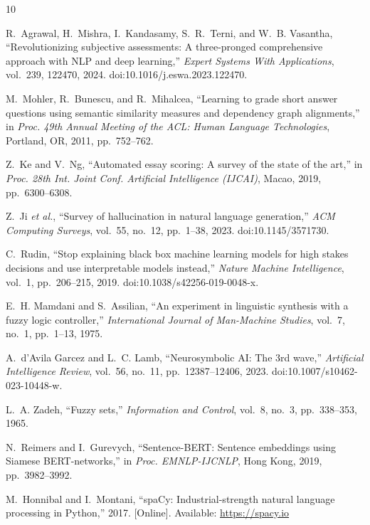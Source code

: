 \documentclass[11pt,a4paper]{article}
\begin{document}
\begin{thebibliography}{10}
\setlength{\itemsep}{0.45em}

R.~Agrawal, H.~Mishra, I.~Kandasamy, S.~R.~Terni, and W.~B. Vasantha,
``Revolutionizing subjective assessments: A three-pronged comprehensive approach
with NLP and deep learning,'' \emph{Expert Systems With Applications}, vol.~239,
122470, 2024. doi:10.1016/j.eswa.2023.122470.

M.~Mohler, R.~Bunescu, and R.~Mihalcea, ``Learning to grade short answer
questions using semantic similarity measures and dependency graph alignments,''
in \emph{Proc. 49th Annual Meeting of the ACL: Human Language Technologies},
Portland, OR, 2011, pp.~752--762.

Z.~Ke and V.~Ng, ``Automated essay scoring: A survey of the state of the art,''
in \emph{Proc. 28th Int. Joint Conf. Artificial Intelligence (IJCAI)}, Macao,
2019, pp.~6300--6308.

Z.~Ji \emph{et al.}, ``Survey of hallucination in natural language generation,''
\emph{ACM Computing Surveys}, vol.~55, no.~12, pp.~1--38, 2023.
doi:10.1145/3571730.

C.~Rudin, ``Stop explaining black box machine learning models for high stakes
decisions and use interpretable models instead,'' \emph{Nature Machine
Intelligence}, vol.~1, pp.~206--215, 2019. doi:10.1038/s42256-019-0048-x.

E.~H. Mamdani and S.~Assilian, ``An experiment in linguistic synthesis with a
fuzzy logic controller,'' \emph{International Journal of Man-Machine Studies},
vol.~7, no.~1, pp.~1--13, 1975.

A.~d'Avila Garcez and L.~C. Lamb, ``Neurosymbolic AI: The 3rd wave,''
\emph{Artificial Intelligence Review}, vol.~56, no.~11, pp.~12387--12406, 2023.
doi:10.1007/s10462-023-10448-w.

L.~A. Zadeh, ``Fuzzy sets,'' \emph{Information and Control}, vol.~8, no.~3,
pp.~338--353, 1965.

N.~Reimers and I.~Gurevych, ``Sentence-BERT: Sentence embeddings using Siamese
BERT-networks,'' in \emph{Proc. EMNLP-IJCNLP}, Hong Kong, 2019, pp.~3982--3992.

M.~Honnibal and I.~Montani, ``spaCy: Industrial-strength natural language
processing in Python,'' 2017. [Online]. Available: \url{https://spacy.io}

\end{thebibliography}
\end{document}
